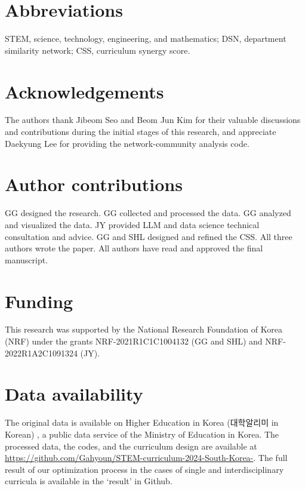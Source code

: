 \documentclass{bmcart}
\begin{document}
\begin{backmatter}
\section*{Abbreviations}
STEM, science, technology, engineering, and mathematics; DSN, department similarity network; CSS, curriculum synergy score.
\section*{Acknowledgements}
The authors thank Jibeom Seo and Beom Jun Kim for their valuable discussions and contributions during the initial stages of this research, and appreciate Daekyung Lee for providing the network-community analysis code.
\section*{Author contributions}
GG designed the research. GG collected and processed the data. GG analyzed and visualized the data. JY provided LLM and data science technical consultation and advice. GG and SHL designed and refined the CSS. All three authors wrote the paper. All authors have read and approved the final manuscript.
\section*{Funding}
This research was supported by the National Research Foundation of Korea (NRF) under the grants NRF-2021R1C1C1004132 (GG and SHL) and NRF-2022R1A2C1091324 (JY).
\section*{Data availability}
The original data is available on Higher Education in Korea (대학알리미 in Korean) \cite{Curriculum2024,Departments2024,data_go_kr}, a public data service of the Ministry of Education in Korea. The processed data, the codes, and the curriculum design are available at \url{https://github.com/Gahyoun/STEM-curriculum-2024-South-Korea-}. The full result of our optimization process in the cases of single and interdisciplinary curricula is available in the `result' in Github.
\end{backmatter}
\end{document}

